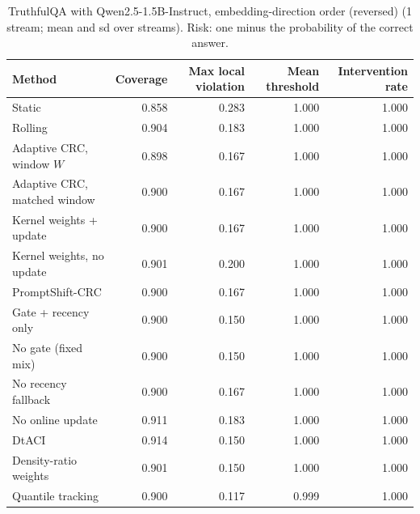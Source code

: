 \begin{table}[H]
\centering
\small
\caption{TruthfulQA with Qwen2.5-1.5B-Instruct, embedding-direction order (reversed) (1 stream; mean and sd over streams). Risk: one minus the probability of the correct answer.}
\label{tab:truthfulqa_pc1_reverse}
\begin{tabular}{lrrrr}
\toprule
Method & Coverage & Max local violation & Mean threshold & Intervention rate \\
\midrule
Static & 0.858 & 0.283 & 1.000 & 1.000 \\
Rolling & 0.904 & 0.183 & 1.000 & 1.000 \\
Adaptive CRC, window $W$ & 0.898 & 0.167 & 1.000 & 1.000 \\
Adaptive CRC, matched window & 0.900 & 0.167 & 1.000 & 1.000 \\
Kernel weights + update & 0.900 & 0.167 & 1.000 & 1.000 \\
Kernel weights, no update & 0.901 & 0.200 & 1.000 & 1.000 \\
PromptShift-CRC & 0.900 & 0.167 & 1.000 & 1.000 \\
Gate + recency only & 0.900 & 0.150 & 1.000 & 1.000 \\
No gate (fixed mix) & 0.900 & 0.150 & 1.000 & 1.000 \\
No recency fallback & 0.900 & 0.167 & 1.000 & 1.000 \\
No online update & 0.911 & 0.183 & 1.000 & 1.000 \\
DtACI & 0.914 & 0.150 & 1.000 & 1.000 \\
Density-ratio weights & 0.901 & 0.150 & 1.000 & 1.000 \\
Quantile tracking & 0.900 & 0.117 & 0.999 & 1.000 \\
\bottomrule
\end{tabular}
\end{table}

